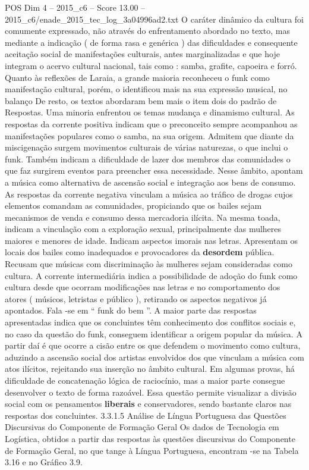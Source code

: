 \begin{textsample}{POS Dim 4 – 2015\_c6 – Score 13.00 – 2015\_c6/enade\_2015\_tec\_log\_3a04996ad2.txt}
O caráter dinâmico da cultura foi comumente expressado, não através do enfrentamento abordado no texto, mas mediante a indicação ( de forma rasa e genérica ) das dificuldades e consequente aceitação social de manifestações culturais, antes marginalizadas e que hoje integram o acervo cultural nacional, tais como : samba, grafite, capoeira e forró.
Quanto às reflexões de Laraia, a grande maioria reconheceu o funk como manifestação cultural, porém, o identificou mais na sua expressão musical, no balanço De resto, os textos abordaram bem mais o item dois do padrão de Respostas.
Uma minoria enfrentou os temas mudança e dinamismo cultural.
As respostas da corrente positiva indicam que o preconceito sempre acompanhou as manifestações populares como o samba, na sua origem.
Admitem que diante da miscigenação surgem movimentos culturais de várias naturezas, o que inclui o funk.
Também indicam a dificuldade de lazer dos membros das comunidades o que faz surgirem eventos para preencher essa necessidade.
Nesse âmbito, apontam a música como alternativa de ascensão social e integração aos bens de consumo.
As respostas da corrente negativa vinculam a música ao tráfico de drogas cujos elementos comandam as comunidades, propiciando que os bailes sejam mecanismos de venda e consumo dessa mercadoria ilícita.
Na mesma toada, indicam a vinculação com a exploração sexual, principalmente das mulheres maiores e menores de idade.
Indicam aspectos imorais nas letras.
Apresentam os locais dos bailes como inadequados e provocadores da \textbf{desordem} pública.
Recusam que músicas com discriminação às mulheres sejam consideradas como cultura.
A corrente intermediária indica a possibilidade de adoção do funk como cultura desde que ocorram modificações nas letras e no comportamento dos atores ( músicos, letristas e público ), retirando os aspectos negativos já apontados.
Fala -se em “ funk do bem ”.
A maior parte das respostas apresentadas indica que os concluintes têm conhecimento dos conflitos sociais e, no caso da questão do funk, conseguem identificar a origem popular da música.
A partir daí é que ocorre a cisão entre os que defendem o movimento como cultura, aduzindo a ascensão social dos artistas envolvidos dos que vinculam a música com atos ilícitos, rejeitando sua inserção no âmbito cultural.
Em algumas provas, há dificuldade de concatenação lógica de raciocínio, mas a maior parte consegue desenvolver o texto de forma razoável.
Essa questão permite visualizar a divisão social com os pensamentos \textbf{liberais} e conservadores, sendo bastante claros nas respostas dos concluintes. 3.3.1.5 Análise de Língua Portuguesa das Questões Discursivas do Componente de Formação Geral Os dados de Tecnologia em Logística, obtidos a partir das respostas às questões discursivas do Componente de Formação Geral, no que tange à Língua Portuguesa, encontram -se na Tabela 3.16 e no Gráfico 3.9.

\end{textsample}
